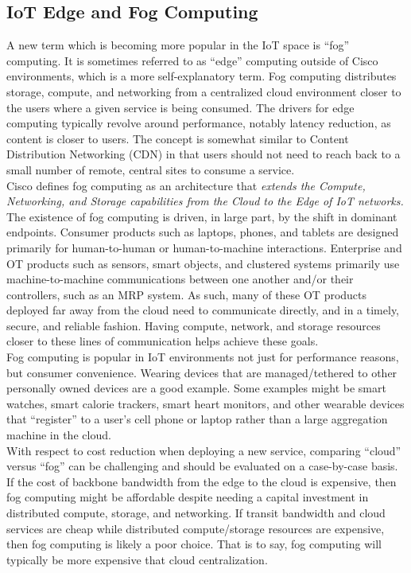 \subsection{IoT Edge and Fog Computing}
A new term which is becoming more popular in the IoT space is ``fog''
computing. It is sometimes referred to as ``edge'' computing outside of Cisco
environments, which is a more self-explanatory term. Fog computing distributes
storage, compute, and networking from a centralized cloud environment closer
to the users where a given service is being consumed. The drivers for edge
computing typically revolve around performance, notably latency reduction, as
content is closer to users. The concept is somewhat similar to Content
Distribution Networking (CDN) in that users should not need to reach back to a
small number of remote, central sites to consume a service. \\

Cisco defines fog computing as an architecture that \textit{extends the Compute,
Networking, and Storage capabilities from the Cloud to the Edge of IoT
networks.} The existence of fog computing is driven, in large part, by the
shift in dominant endpoints. Consumer products such as laptops, phones, and
tablets are designed primarily for human-to-human or human-to-machine
interactions. Enterprise and OT products such as sensors, smart objects, and
clustered systems primarily use machine-to-machine communications between one
another and/or their controllers, such as an MRP system. As such, many of
these OT products deployed far away from the cloud need to communicate
directly, and in a timely, secure, and reliable fashion. Having compute,
network, and storage resources closer to these lines of communication helps
achieve these goals. \\

Fog computing is popular in IoT environments not just for performance reasons,
but consumer convenience. Wearing devices that are managed/tethered to other
personally owned devices are a good example. Some examples might be smart
watches, smart calorie trackers, smart heart monitors, and other wearable
devices that ``register'' to a user’s cell phone or laptop rather than a large
aggregation machine in the cloud. \\

With respect to cost reduction when deploying a new service, comparing
``cloud'' versus ``fog'' can be challenging and should be evaluated on a
case-by-case basis. If the cost of backbone bandwidth from the edge to the
cloud is expensive, then fog computing might be affordable despite needing a
capital investment in distributed compute, storage, and networking. If transit
bandwidth and cloud services are cheap while distributed compute/storage
resources are expensive, then fog computing is likely a poor choice. That is
to say, fog computing will typically be more expensive that cloud
centralization. \\

